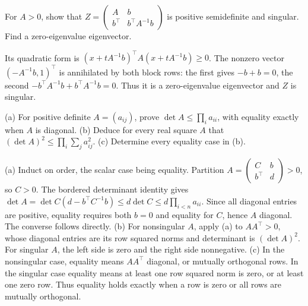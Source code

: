 \begin{problem}\label{ex:12:ineq-ma-25}
For \(A>0\), show that
\(Z=\begin{pmatrix}A&b\\b^\top&b^\top A^{-1}b\end{pmatrix}\)
is positive semidefinite and singular. Find a zero-eigenvalue eigenvector.
\end{problem}
\begin{solution}
Its quadratic form is
\((x+tA^{-1}b)^\top A(x+tA^{-1}b)\geqslant0\).
The nonzero vector \((-A^{-1}b,1)^\top\) is annihilated by both block
rows: the first gives \(-b+b=0\), the second
\(-b^\top A^{-1}b+b^\top A^{-1}b=0\).
Thus it is a zero-eigenvalue eigenvector and \(Z\) is singular.
\end{solution}

\begin{problem}\label{ex:12:ineq-ma-26}
(a) For positive definite \(A=(a_{ij})\), prove
\(\det A\leqslant\prod_i a_{ii}\), with equality exactly when \(A\)
is diagonal.
(b) Deduce for every real square \(A\) that
\((\det A)^2\leqslant\prod_i\sum_j a_{ij}^2\).
(c) Determine every equality case in (b).
\end{problem}
\begin{solution}
(a) Induct on order, the scalar case being equality. Partition
\(A=\begin{pmatrix}C&b\\b^\top&d\end{pmatrix}>0\), so \(C>0\).
The bordered determinant identity gives
\(\det A=\det C(d-b^\top C^{-1}b)\leqslant d\det C
\leqslant d\prod_{i<n}a_{ii}\).
Since all diagonal entries are positive, equality requires both \(b=0\)
and equality for \(C\), hence \(A\) diagonal. The converse follows directly.
(b) For nonsingular \(A\), apply (a) to \(AA^\top>0\), whose diagonal
entries are its row squared norms and determinant is \((\det A)^2\).
For singular \(A\), the left side is zero and the right side nonnegative.
(c) In the nonsingular case, equality means \(AA^\top\) diagonal, or
mutually orthogonal rows. In the singular case equality means at least
one row squared norm is zero, or at least one zero row. Thus equality
holds exactly when a row is zero or all rows are mutually orthogonal.
\end{solution}

